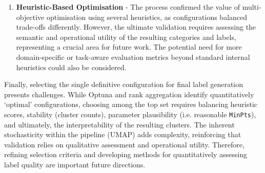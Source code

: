 \documentclass[10pt,oneside]{report}
\begin{document}
\begin{enumerate}
    \item \textbf{Heuristic-Based Optimisation} - The process confirmed the value of multi-objective optimisation using several heuristics, as configurations balanced trade-offs differently. However, the ultimate validation requires assessing the semantic and operational utility of the resulting categories and labels, representing a crucial area for future work. The potential need for more domain-specific or task-aware evaluation metrics beyond standard internal heuristics could also be considered.
\end{enumerate}



\noindent Finally, selecting the single definitive configuration for final label generation presents challenges. While Optuna and rank aggregation identify quantitatively `optimal' configurations, choosing among the top set requires balancing heuristic scores, stability (cluster counts), parameter plausibility (i.e. reasonable \texttt{MinPts}), and ultimately, the interpretability of the resulting clusters. The inherent stochasticity within the pipeline (UMAP) adds complexity, reinforcing that validation relies on qualitative assessment and operational utility. Therefore, refining selection criteria and developing methods for quantitatively assessing label quality are important future directions.
\end{document}
